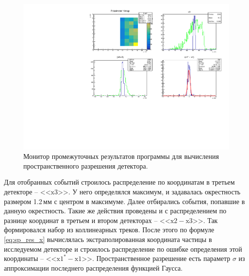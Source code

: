 \begin{figure}[h]
	\centering
	\includegraphics[width= 16cm]{img/sp_res_monitor.pdf}
	\caption{Монитор промежуточных результатов программы для вычисления пространственного разрешения детектора.}		
	\label{fig:sp_res_monitor}
\end{figure}
Для отобранных событий строилось распределение по координатам в третьем детекторе -- <<$\text{x}3$>>. У него определялся максимум, и задавалась окрестность размером 1.2\,мм с центром в максимуме. Далее отбирались события, попавшие в данную окрестность. Такие же действия проведены и с распределением по разнице координат в третьем и втором детекторах -- <<$\text{x}2 - \text{x}3$>>. Так формировался набор из коллинеарных треков. После этого по формуле \ref{eq:sp_res_x} вычислялась экстраполированная координата частицы в исследуемом детекторе и строилось распределение по ошибке определения этой координаты -- <<$\text{x}1^* - \text{x}1$>>.  Пространственное разрешение есть параметр $\sigma$ из аппроксимации последнего распределения функцией Гаусса.
